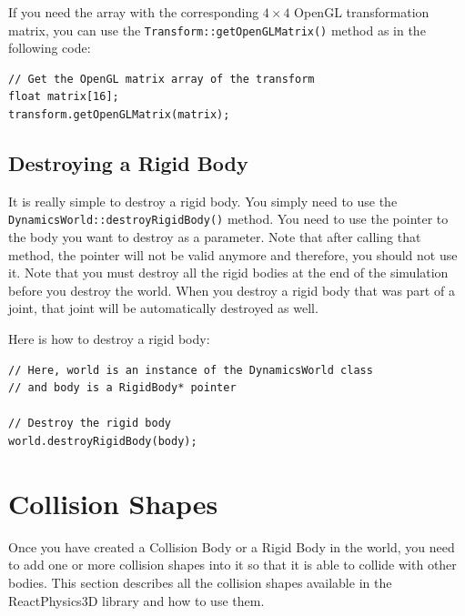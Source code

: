 \documentclass[a4paper,12pt]{article}
\begin{document}
    \vspace{0.6cm}

    If you need the array with the corresponding $4 \times 4$ OpenGL transformation matrix, you can use the \texttt{Transform::getOpenGLMatrix()} method as in the
    following code: \\

    \begin{lstlisting}
// Get the OpenGL matrix array of the transform
float matrix[16];
transform.getOpenGLMatrix(matrix);
  \end{lstlisting}

    \subsection{Destroying a Rigid Body}

    \begin{sloppypar}
    It is really simple to destroy a rigid body. You simply need to use the \texttt{DynamicsWorld::destroyRigidBody()} method. You need to use the pointer to the body you
    want to destroy as a parameter. Note that after calling that method, the pointer will not be valid anymore and therefore, you should not use it. Note that you must
    destroy all the rigid bodies at the end of the simulation before you destroy the world. When you destroy a rigid body that was part of a joint, that joint will be
    automatically destroyed as well. \\
    \end{sloppypar}

    Here is how to destroy a rigid body: \\

    \begin{lstlisting}
// Here, world is an instance of the DynamicsWorld class
// and body is a RigidBody* pointer

// Destroy the rigid body
world.destroyRigidBody(body);
  \end{lstlisting}

    \section{Collision Shapes}
    \label{sec:collisionshapes}

    Once you have created a Collision Body or a Rigid Body in the world, you need to add one or more collision shapes into it so that it is able to collide with other bodies.
    This section describes all the collision shapes available in the ReactPhysics3D library and how to use them. \\
\end{document}
